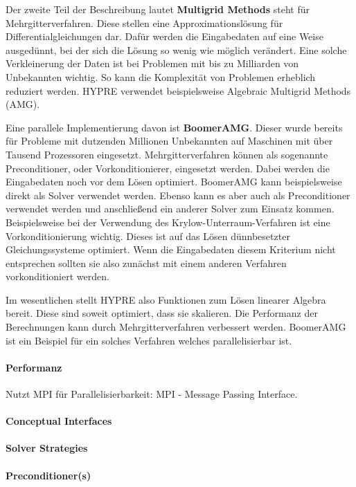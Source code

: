 \documentclass[a4paper,10pt]{article}
\numberwithin{figure}{section}
\numberwithin{table}{section}
\begin{document}
Der zweite Teil der Beschreibung lautet \textbf{Multigrid Methods} steht für Mehrgitterverfahren.
Diese stellen eine Approximationslösung für Differentialgleichungen dar.
Dafür werden die Eingabedaten auf eine Weise ausgedünnt, bei der sich die Lösung so wenig wie möglich verändert.
Eine solche Verkleinerung der Daten ist bei Problemen mit bis zu Milliarden von Unbekannten wichtig.
So kann die Komplexität von Problemen erheblich reduziert werden.
HYPRE verwendet beispielsweise Algebraic Multigrid Methods (AMG).

Eine parallele Implementierung davon ist \textbf{BoomerAMG}.
Dieser wurde bereits für Probleme mit dutzenden Millionen Unbekannten auf Maschinen mit über Tausend Prozessoren eingesetzt.\cite{Henson00boomeramg}
Mehrgitterverfahren können als sogenannte Preconditioner, oder Vorkonditionierer, eingesetzt werden.
Dabei werden die Eingabedaten noch vor dem Lösen optimiert.
BoomerAMG kann beispielsweise direkt als Solver verwendet werden.
Ebenso kann es aber auch als Preconditioner verwendet werden und anschließend ein anderer Solver zum Einsatz kommen.
Beispielsweise bei der Verwendung des Krylow-Unterraum-Verfahren ist eine Vorkonditionierung wichtig.
Dieses ist auf das Lösen dünnbesetzter Gleichungssysteme optimiert.
Wenn die Eingabedaten diesem Kriterium nicht entsprechen sollten sie also zunächst mit einem anderen Verfahren vorkonditioniert werden.

Im wesentlichen stellt HYPRE also Funktionen zum Lösen linearer Algebra bereit.
Diese sind soweit optimiert, dass sie skalieren.
Die Performanz der Berechnungen kann durch Mehrgitterverfahren verbessert werden.
BoomerAMG ist ein Beispiel für ein solches Verfahren welches parallelisierbar ist.

\paragraph{Performanz}
Nutzt MPI für Parallelisierbarkeit: MPI - Message Passing Interface.


\paragraph{Conceptual Interfaces}
\paragraph{Solver Strategies}
\paragraph{Preconditioner(s)}
\end{document}
